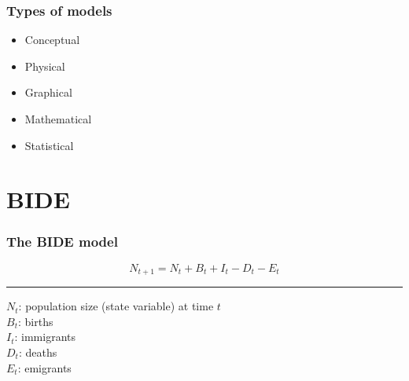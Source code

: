 \documentclass[color=usenames,dvipsnames]{beamer}\usepackage[]{graphicx}\usepackage[]{color}
\begin{document}




\begin{frame}
  \frametitle{Types of models}
  \LARGE
  \begin{itemize}
    \item { Conceptual}
    \item Physical
    \item Graphical
    \item {\color<2>{Red} Mathematical}
    \item { Statistical}
  \end{itemize}
\end{frame}





\section{BIDE}


\begin{frame}
  \frametitle{The BIDE model}
  \huge
  \[
  N_{t+1} = N_t + B_t + I_t - D_t - E_t
  \]
  \large
  \vfill
  \centering \rule{4cm}{1pt} \flushleft \par
  \vfill
  \Large
  $N_t$: population size (state variable) at time $t$ \\
  $B_t$: births \\
  $I_t$: immigrants \\
  $D_t$: deaths \\
  $E_t$: emigrants
\end{frame}
\end{document}

